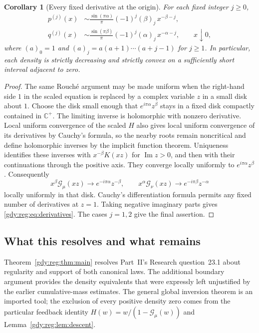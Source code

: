 \documentclass[11pt]{article}
\numberwithin{equation}{section}
\newtheorem{corollary}[theorem]{Corollary}
\theoremstyle{definition}
\theoremstyle{remark}
\DeclareMathOperator{\Ima}{Im}
\begin{document}
\begin{corollary}[Every fixed derivative at the origin]
\label{gdy:reg:cor:derivatives}
For each fixed integer $j\ge0$,
\begin{equation}\label{gdy:reg:eq:derivatives}
 \begin{split}
 p^{(j)}(x)&\sim
   \frac{\sin(\pi\alpha)}\pi
   (-1)^j(\beta)_j\,x^{-\beta-j},\\
 q^{(j)}(x)&\sim
   \frac{\sin(\pi\beta)}\pi
   (-1)^j(\alpha)_j\,x^{-\alpha-j},
 \qquad x\downarrow0,
 \end{split}
\end{equation}
where $(a)_0=1$ and $(a)_j=a(a+1)\cdots(a+j-1)$ for $j\ge1$.
In particular, each density is strictly decreasing and strictly convex
on a sufficiently short interval adjacent to zero.
\end{corollary}
\begin{proof}
The same Rouch\'e argument may be made uniform when the right-hand side
$1$ in the scaled equation is replaced by a complex variable $z$ in a
small disk about $1$.
Choose the disk small enough that
$e^{i\pi\alpha}z^\beta$ stays in a fixed disk compactly contained in
$\mathbb C^+$.  The limiting inverse is holomorphic with nonzero
derivative.  Local uniform convergence of the scaled $H$ also gives
local uniform convergence of its derivatives by Cauchy's formula, so
the nearby roots remain noncritical and define holomorphic inverses by
the implicit function theorem.  Uniqueness identifies these inverses with
$x^{-\beta}K(xz)$ for $\Ima z>0$, and then with their
continuations through the positive axis.  They converge locally
uniformly to $e^{i\pi\alpha}z^\beta$.
Consequently
\[
 x^\beta\mathcal G_\mu(xz)
   \longrightarrow e^{-i\pi\alpha}z^{-\beta},\qquad
 x^\alpha\mathcal G_\nu(xz)
   \longrightarrow e^{-i\pi\beta}z^{-\alpha}
\]
locally uniformly in that disk.  Cauchy's differentiation formula
permits any fixed number of derivatives at $z=1$.
Taking negative imaginary parts gives \eqref{gdy:reg:eq:derivatives}.
The cases $j=1,2$ give the final assertion.
\end{proof}

\subsection{What this resolves and what remains}
\label{gdy:reg:subsec:scope}

Theorem~\ref{gdy:reg:thm:main} resolves Part~II's Research question~23.1
about regularity and support of both canonical laws.  The additional boundary
argument provides the density equivalents that were expressly left
unjustified by the earlier cumulative-mass estimates.  The general
global inversion theorem is an imported tool; the exclusion of every
positive density zero comes from the particular feedback identity
$H(w)=w/(1-\mathcal G_\mu(w))$ and
Lemma~\ref{gdy:reg:lem:descent}.
\end{document}
